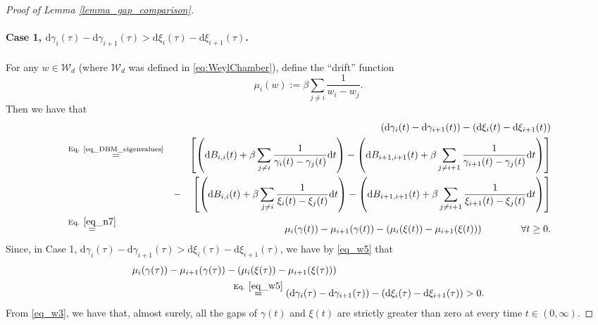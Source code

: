 \documentclass[11pt,letterpaper]{article}
\begin{document}
\begin{proof}[Proof of Lemma \ref{lemma_gap_comparison}]
\paragraph{Case 1,  $\mathrm{d}  \gamma_i(\tau) - \mathrm{d}  \gamma_{i+1}(\tau) > \mathrm{d} \xi_i(\tau) - \mathrm{d}  \xi_{i+1}(\tau)$.}
%
For any $w \in \mathcal{W}_d$ (where $\mathcal{W}_d$ was defined in \eqref{eq:WeylChamber}), define the ``drift'' function
%
\begin{equation}\label{eq_n7}
    \mu_i(w) := \beta\sum_{j \neq i} \frac{1}{w_i - w_j}.
\end{equation}
%
Then we have that
%
\begin{eqnarray}\label{eq_w5}
& & \!\!\! \!\!\!\!  \!\!\!\! \!\!\!\!\!\!\!\! \!\!\!\!  \!\!\!\! \!\!\!\!  (\mathrm{d} \gamma_i(t) - \mathrm{d} \gamma_{i+1} (t))- (\mathrm{d} \xi_i(t) - \mathrm{d} \xi_{i+1} (t))\\ &\stackrel{\textrm{Eq. \eqref{eq_DBM_eigenvalues}}}{=}&  \left[\left(\mathrm{d}B_{i, i}(t) +  \beta \sum_{j \neq i} \frac{1}{\gamma_i(t) - \gamma_j(t)} \mathrm{d}t \right)
%
-  \left(\mathrm{d}B_{i+1, i+1}(t) +  \beta \sum_{j \neq i+1} \frac{1}{\gamma_{i+1}(t) - \gamma_j(t)} \mathrm{d}t \right) \right] \nonumber\\
%
& &   - \quad \left[\left(\mathrm{d}B_{i, i}(t) +  \beta \sum_{j \neq i} \frac{1}{\xi_i(t) - \xi_j(t)} \mathrm{d}t \right) -  \left(\mathrm{d}B_{i+1, i+1}(t) +  \beta \sum_{j \neq i+1} \frac{1}{\xi_{i+1}(t) - \xi_j(t)} \mathrm{d}t \right) \right] \nonumber\\
%
&\stackrel{\textrm{Eq. } \eqref{eq_n7}}{=}& \mu_i(\gamma(t)) - \mu_{i+1}(\gamma(t)) - (\mu_i(\xi(t)) - \mu_{i+1}(\xi(t))) \qquad  \qquad\forall t \geq 0.\nonumber
\end{eqnarray}
%
Since, in Case 1, 
$\mathrm{d}  \gamma_i(\tau) - \mathrm{d}  \gamma_{i+1}(\tau) > \mathrm{d} \xi_i(\tau) - \mathrm{d}  \xi_{i+1}(\tau)$,
%
we have by \eqref{eq_w5} that
%
\begin{align}\label{eq_w6}
&\mu_i(\gamma(\tau)) - \mu_{i+1}(\gamma(\tau)) - (\mu_i(\xi(\tau)) - \mu_{i+1}(\xi(\tau))) \nonumber\\
%
& \qquad \qquad \qquad  \qquad \qquad \stackrel{\textrm{Eq. } \eqref{eq_w5}}{=} (\mathrm{d} \gamma_i(\tau) - \mathrm{d} \gamma_{i+1} (\tau))- (\mathrm{d} \xi_i(\tau) - \mathrm{d} \xi_{i+1} (\tau)) >0.
%
\end{align}
%
From \eqref{eq_w3}, we have that, almost surely, all the gaps of $\gamma(t)$ and $\xi(t)$ are strictly greater than zero at every time $t \in (0,\infty)$.
%

\end{proof}
\end{document}
